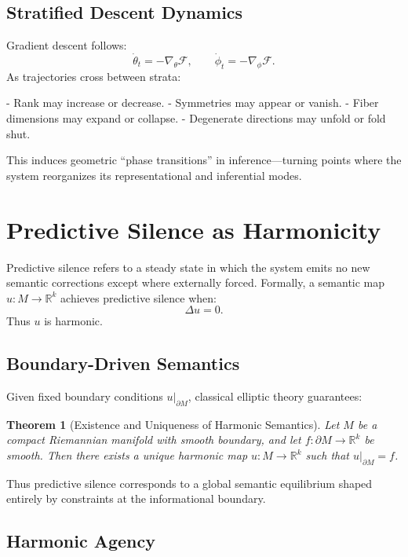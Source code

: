 \documentclass[12pt]{article}
\theoremstyle{plain}
\newtheorem{theorem}{Theorem}[section]
\theoremstyle{definition}
\theoremstyle{remark}
\newcommand{\FreeEnergy}{\mathcal{F}}
\begin{document}
\subsection{Stratified Descent Dynamics}

Gradient descent follows:
\[
\dot{\theta}_t = -\nabla_\theta \FreeEnergy,
\qquad
\dot{\phi}_t = -\nabla_\phi \FreeEnergy.
\]
As trajectories cross between strata:

- Rank may increase or decrease.  
- Symmetries may appear or vanish.  
- Fiber dimensions may expand or collapse.  
- Degenerate directions may unfold or fold shut.  

This induces geometric ``phase transitions'' in inference---turning points
where the system reorganizes its representational and inferential modes.

\section{Predictive Silence as Harmonicity}

Predictive silence refers to a steady state in which the system emits no new 
semantic corrections except where externally forced. Formally, a semantic map 
$u : M \to \mathbb{R}^k$ achieves predictive silence when:
\[
\Delta u = 0.
\]
Thus $u$ is harmonic. 

\subsection{Boundary-Driven Semantics}

Given fixed boundary conditions $u \vert_{\partial M}$, classical elliptic 
theory \citep{evans2010partial} guarantees:

\begin{theorem}[Existence and Uniqueness of Harmonic Semantics]
Let $M$ be a compact Riemannian manifold with smooth boundary, and let 
$f : \partial M \to \mathbb{R}^k$ be smooth. Then there exists a unique 
harmonic map $u : M \to \mathbb{R}^k$ such that $u\vert_{\partial M} = f$.
\end{theorem}

Thus predictive silence corresponds to a global semantic equilibrium shaped 
entirely by constraints at the informational boundary.

\subsection{Harmonic Agency}
\end{document}
